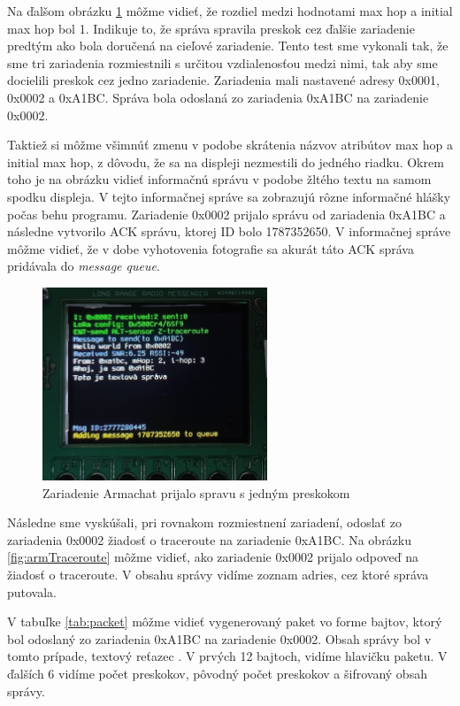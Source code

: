 \documentclass[slovak,master]{diploma}
\begin{document}
Na ďalšom obrázku \ref{fig:armRec2} môžme vidieť, že rozdiel medzi hodnotami max hop a initial max hop bol 1. Indikuje to, že správa spravila preskok cez ďalšie zariadenie predtým ako 
bola doručená na cieľové zariadenie. Tento test sme vykonali tak, že sme tri zariadenia rozmiestnili s určitou vzdialenosťou medzi nimi, tak aby sme docielili preskok cez jedno zariadenie. 
Zariadenia mali nastavené adresy 0x0001, 0x0002 a 0xA1BC. Správa bola odoslaná zo zariadenia 0xA1BC na zariadenie 0x0002.

Taktiež si môžme všimnúť zmenu v podobe skrátenia názvov atribútov max hop a initial max hop, z dôvodu, že sa na displeji nezmestili do jedného riadku.
Okrem toho je na obrázku vidieť informačnú správu v podobe žltého textu na samom spodku displeja. V tejto informačnej správe sa zobrazujú 
rôzne informačné hlášky počas behu programu. Zariadenie 0x0002 prijalo správu od zariadenia 0xA1BC a následne vytvorilo ACK správu, ktorej ID bolo 1787352650.
V informačnej správe môžme vidieť, že v dobe vyhotovenia fotografie sa akurát táto ACK správa pridávala do \emph{message queue}.

\begin{figure}
	\centering
	\includegraphics[width=0.6\textwidth]{Figures/armRec2.jpg}
	\caption{Zariadenie Armachat prijalo spravu s jedným preskokom}
	\label{fig:armRec2}
\end{figure}

Následne sme vyskúšali, pri rovnakom rozmiestnení zariadení, odoslať zo zariadenia 0x0002 žiadosť o traceroute na zariadenie 0xA1BC. Na obrázku \ref{fig:armTraceroute} môžme 
vidieť, ako zariadenie 0x0002 prijalo odpoveď na žiadosť o traceroute. V obsahu správy vidíme zoznam adries, cez ktoré správa putovala.

V tabuľke \ref{tab:packet} môžme vidieť vygenerovaný paket vo forme bajtov, ktorý bol odoslaný zo zariadenia 0xA1BC na zariadenie 0x0002. Obsah správy bol v tomto prípade, 
textový reťazec . V prvých 12 bajtoch, vidíme hlavičku paketu. V ďalších 6 vidíme počet preskokov, pôvodný počet preskokov a šifrovaný obsah správy.
\end{document}

